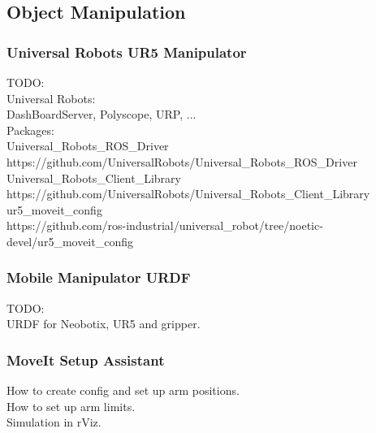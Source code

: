 \subsection{Object Manipulation}


\subsubsection{Universal Robots UR5 Manipulator}
TODO:\\
Universal Robots:\\
DashBoardServer, Polyscope, URP, ...\\

Packages:\\
Universal\_Robots\_ROS\_Driver
https://github.com/UniversalRobots/Universal\_Robots\_ROS\_Driver\\

Universal\_Robots\_Client\_Library\\
https://github.com/UniversalRobots/Universal\_Robots\_Client\_Library\\

ur5\_moveit\_config\\
https://github.com/ros-industrial/universal\_robot/tree/noetic-devel/ur5\_moveit\_config\\



\subsubsection{Mobile Manipulator URDF}
TODO:\\
URDF for Neobotix, UR5 and gripper.\\

\subsubsection{MoveIt Setup Assistant}
How to create config and set up arm positions.\\
How to set up arm limits.\\
Simulation in rViz.\\








